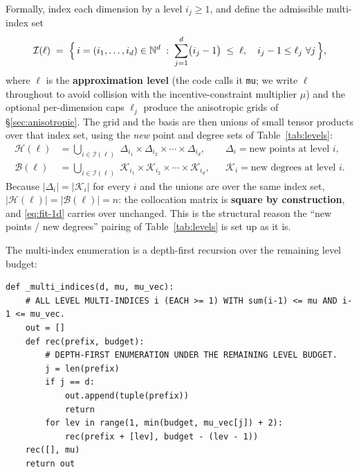 \documentclass[11pt]{article}
\numberwithin{equation}{section}
\newcommand{\N}{\mathbb{N}}
\newcommand{\code}[1]{\texttt{\small #1}}
\theoremstyle{definition}
\theoremstyle{plain}
\theoremstyle{remark}
\begin{document}
Formally, index each dimension by a level $i_j\ge1$, and define the admissible
multi-index set
\begin{equation}
\mathcal{I}(\ell)\;=\;\Bigl\{\,i=(i_1,\dots,i_d)\in\N^{d}\;:\;
\sum_{j=1}^{d}\bigl(i_j-1\bigr)\;\le\;\ell,
\quad i_j-1\le\ell_j\ \forall j\,\Bigr\},
\label{eq:multi-index}
\end{equation}
where $\ell$ is the \textbf{approximation level} (the code calls it \code{mu}; we
write $\ell$ throughout to avoid collision with the incentive-constraint multiplier
$\mu$) and the optional per-dimension caps $\ell_j$ produce the anisotropic grids of
\S\ref{sec:anisotropic}. The grid and the basis are then unions of small tensor
products over that index set, using the \emph{new} point and degree sets of
Table~\ref{tab:levels}:
\begin{align}
\mathcal{H}(\ell)&=\bigcup_{i\in\mathcal{I}(\ell)}\;
   \Delta_{i_1}\times\Delta_{i_2}\times\cdots\times\Delta_{i_d},
&&\Delta_i=\text{new points at level }i,
\label{eq:smolyak-grid}\\[3pt]
\mathcal{B}(\ell)&=\bigcup_{i\in\mathcal{I}(\ell)}\;
   \mathcal{K}_{i_1}\times\mathcal{K}_{i_2}\times\cdots\times\mathcal{K}_{i_d},
&&\mathcal{K}_i=\text{new degrees at level }i .
\label{eq:smolyak-basis}
\end{align}
Because $|\Delta_i|=|\mathcal{K}_i|$ for every $i$ and the unions are over the same
index set, $|\mathcal{H}(\ell)|=|\mathcal{B}(\ell)|=n$: the collocation matrix is
\textbf{square by construction}, and \eqref{eq:fit-1d} carries over unchanged. This
is the structural reason the ``new points / new degrees'' pairing of
Table~\ref{tab:levels} is set up as it is.

The multi-index enumeration is a depth-first recursion over the remaining level
budget:

\begin{lstlisting}[caption={Enumerating $\mathcal{I}(\ell)$. \code{state\_grid.py}, \code{\_multi\_indices}.}]
def _multi_indices(d, mu, mu_vec):
    # ALL LEVEL MULTI-INDICES i (EACH >= 1) WITH sum(i-1) <= mu AND i-1 <= mu_vec.
    out = []
    def rec(prefix, budget):
        # DEPTH-FIRST ENUMERATION UNDER THE REMAINING LEVEL BUDGET.
        j = len(prefix)
        if j == d:
            out.append(tuple(prefix))
            return
        for lev in range(1, min(budget, mu_vec[j]) + 2):
            rec(prefix + [lev], budget - (lev - 1))
    rec([], mu)
    return out
\end{lstlisting}
\end{document}
